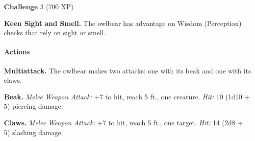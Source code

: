 \documentclass[
]{article}
\begin{document}
\textbf{Challenge} 3 (700 XP)

\textbf{Keen Sight and Smell.} The owlbear has advantage on Wisdom
(Perception) checks that rely on sight or smell.

\hypertarget{actions-8}{%
\paragraph{Actions}\label{actions-8}}

\textbf{Multiattack.} The owlbear makes two attacks: one with its beak
and one with its claws.

\textbf{Beak.} \emph{Melee Weapon Attack:} +7 to hit, reach 5 ft., one
creature. \emph{Hit:} 10 (1d10 + 5) piercing damage.

\textbf{Claws.} \emph{Melee Weapon Attack:} +7 to hit, reach 5 ft., one
target. \emph{Hit:} 14 (2d8 + 5) slashing damage.
\end{document}
